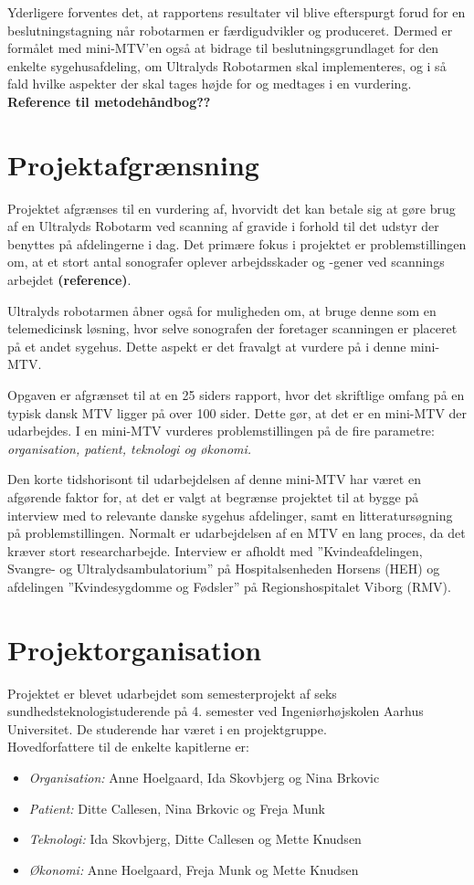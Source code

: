 Yderligere forventes det, at rapportens resultater vil blive efterspurgt forud for en beslutningstagning når robotarmen er færdigudvikler og produceret. Dermed er formålet med mini-MTV’en også at bidrage til beslutningsgrundlaget for den enkelte sygehusafdeling, om Ultralyds Robotarmen skal implementeres, og i så fald hvilke aspekter der skal tages højde for og medtages i en vurdering. \textbf{Reference til metodehåndbog??}

\section{Projektafgrænsning}
Projektet afgrænses til en vurdering af, hvorvidt det kan betale sig at gøre brug af en Ultralyds Robotarm ved scanning af gravide i forhold til det udstyr der benyttes på afdelingerne i dag. Det primære fokus i projektet er problemstillingen om, at et stort antal sonografer oplever arbejdsskader og -gener ved scannings arbejdet \textbf{(reference)}. 

Ultralyds robotarmen åbner også for muligheden om, at bruge denne som en telemedicinsk løsning, hvor selve sonografen der foretager scanningen er placeret på et andet sygehus. Dette aspekt er det fravalgt at vurdere på i denne mini-MTV. 

Opgaven er afgrænset til at en 25 siders rapport, hvor det skriftlige omfang på en typisk dansk MTV ligger på over 100 sider. Dette gør, at det er en mini-MTV der udarbejdes. I en mini-MTV vurderes problemstillingen på de fire parametre: \textit{organisation, patient, teknologi og økonomi.} 

Den korte tidshorisont til udarbejdelsen af denne mini-MTV har været en afgørende faktor for, at det er valgt at begrænse projektet til at bygge på interview med to relevante danske sygehus afdelinger, samt en litteratursøgning på problemstillingen. Normalt er udarbejdelsen af en MTV en lang proces, da det kræver stort researcharbejde. Interview er afholdt med ”Kvindeafdelingen, Svangre- og Ultralydsambulatorium” på Hospitalsenheden Horsens (HEH) og afdelingen ”Kvindesygdomme og Fødsler” på Regionshospitalet Viborg (RMV).

\section{Projektorganisation}
Projektet er blevet udarbejdet som semesterprojekt af seks sundhedsteknologistuderende på 4. semester ved Ingeniørhøjskolen Aarhus Universitet. De studerende har været i en projektgruppe. \\
Hovedforfattere til de enkelte kapitlerne er:
\begin{itemize}
\item \textit{Organisation: }Anne Hoelgaard, Ida Skovbjerg og Nina Brkovic
\item \textit{Patient: }Ditte Callesen, Nina Brkovic og Freja Munk
\item \textit{Teknologi: }Ida Skovbjerg, Ditte Callesen og Mette Knudsen
\item \textit{Økonomi: }Anne Hoelgaard, Freja Munk og Mette Knudsen
\end{itemize}

\label{version_Systemark}
